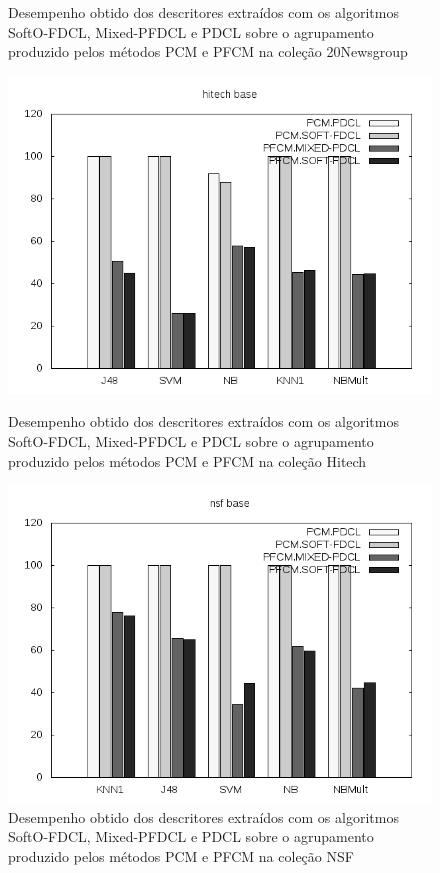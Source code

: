 \begin{figure}[!h]
\begin{minipage}{0.48\textwidth}
    \caption{Desempenho obtido dos descritores extraídos com os algoritmos SoftO-FDCL, Mixed-PFDCL e
    PDCL sobre o agrupamento produzido pelos métodos PCM e PFCM na coleção 20Newsgroup} 
     \label{fig:pdcl20news} 
   \end{minipage} 
\end{figure}

\begin{figure}[!h] \centering 
   \begin{minipage}{0.48\textwidth} 
     \centering
    \includegraphics[width=1.0\columnwidth]{assets/pdcl/hitech} 
    \caption{Desempenho obtido dos descritores extraídos com os algoritmos SoftO-FDCL, Mixed-PFDCL e
    PDCL sobre o agrupamento produzido pelos métodos PCM e PFCM na coleção Hitech} 
  \label{fig:pdclhitech}
  \end{minipage}\hfill 
  \begin{minipage}{0.48\textwidth} \centering
    \includegraphics[width=1.0\columnwidth]{assets/pdcl/nsf} 
    \caption{Desempenho obtido dos descritores extraídos com os algoritmos SoftO-FDCL, Mixed-PFDCL e
    PDCL sobre o agrupamento produzido pelos métodos PCM e PFCM na coleção NSF} 
     \label{fig:pdclnsf} 
   \end{minipage} 
\end{figure}

